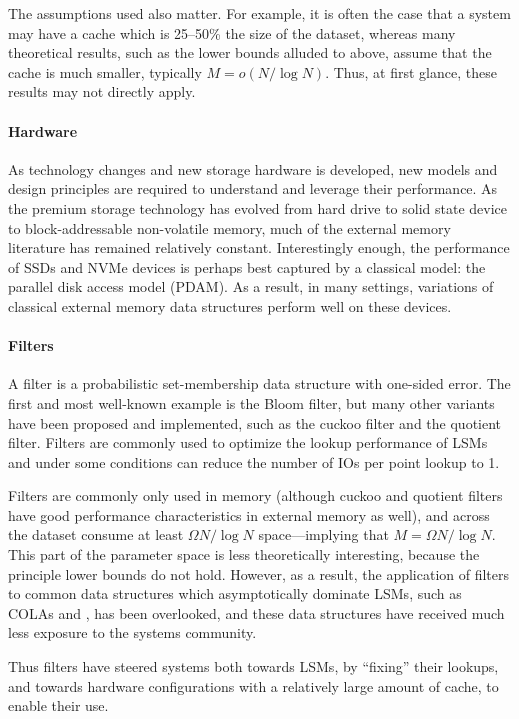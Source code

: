 The assumptions used also matter. For example, it is often the case that a
system may have a cache which is 25--50\% the size of the dataset, whereas many
theoretical results, such as the lower bounds alluded to above, assume that the
cache is much smaller, typically $M = o(N/\log{N})$. Thus, at first glance,
these results may not directly apply.

\paragraph{Hardware}
As technology changes and new storage hardware is developed, new models and
design principles are required to understand and leverage their performance. As
the premium storage technology has evolved from hard drive to solid state
device to block-addressable non-volatile memory, much of the external memory
literature has remained relatively constant. Interestingly enough, the
performance of SSDs and NVMe devices is perhaps best captured by a classical
model: the parallel disk access model (PDAM). As a result, in many settings,
variations of classical external memory data structures perform well on these
devices.

\paragraph{Filters}
A filter is a probabilistic set-membership data structure with one-sided error.
The first and most well-known example is the Bloom filter, but many other
variants have been proposed and implemented, such as the cuckoo filter and the
quotient filter. Filters are commonly used to optimize the lookup performance
of LSMs and under some conditions can reduce the number of IOs per point lookup
to 1.

Filters are commonly only used in memory (although cuckoo and quotient filters
have good performance characteristics in external memory as well), and across
the dataset consume at least $\Omega{N/\log{N}}$ space---implying that $M =
\Omega{N/\log{N}}$. This part of the parameter space is less theoretically
interesting, because the principle lower bounds do not hold. However, as a
result, the application of filters to common data structures which
asymptotically dominate LSMs, such as COLAs and \bets, has been overlooked, and
these data structures have received much less exposure to the systems
community.

Thus filters have steered systems both towards LSMs, by ``fixing'' their
lookups, and towards hardware configurations with a relatively large amount of
cache, to enable their use.

